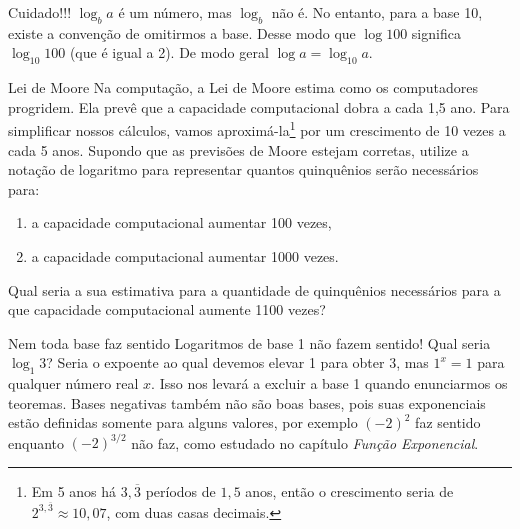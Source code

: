 \begin{observationtitle}{Cuidado!!!}
$\log_b a$ é um número, mas $\log_b$ não é. No entanto, para a base 10, existe a convenção de omitirmos a base. Desse modo que $\log 100$ significa $\log_{10} 100$ (que é igual a 2). De modo geral $\log a =\log_{10} a$.
\end{observationtitle}


\begin{task}{Lei de Moore}
Na computação, a Lei de Moore estima como os computadores progridem. Ela prevê que a capacidade computacional dobra a cada 1,5 ano. Para simplificar nossos cálculos, vamos aproximá-la\footnote{Em 5 anos há $3,\overline{3}$ períodos de $1,5$ anos, então o crescimento seria de $2^{3,\overline{3}} \approx 10,07$, com duas casas decimais.} por um crescimento de 10 vezes a cada 5 anos. Supondo que as previsões de Moore estejam corretas, utilize a notação de logaritmo para representar quantos quinquênios serão necessários para:
\begin{enumerate}
\item a capacidade computacional aumentar 100 vezes,
\item a capacidade computacional aumentar 1000 vezes.
\end{enumerate}
Qual seria a sua estimativa para a quantidade de quinquênios necessários para a que capacidade computacional aumente 1100 vezes?
\end{task}

\begin{observationtitle}{Nem toda base faz sentido}
Logaritmos de base 1 não fazem sentido! Qual seria $\log_1 3$? Seria o expoente ao qual devemos elevar 1 para obter 3, mas $1^x = 1$ para qualquer número real $x$. Isso nos levará a excluir a base 1 quando enunciarmos os teoremas. Bases negativas também não são boas bases, pois suas exponenciais estão definidas somente para alguns valores, por exemplo $(-2)^2$ faz sentido enquanto $(-2)^{3/2}$ não faz, como estudado no capítulo \textit{Função Exponencial}.
\end{observationtitle}

